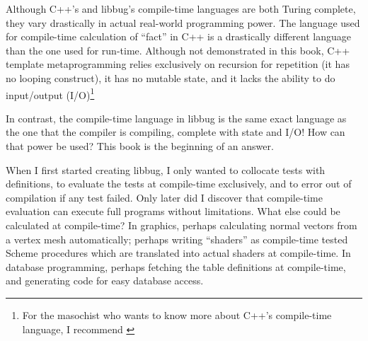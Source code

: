  Although C++'s and libbug's compile-time languages are both Turing complete,
 they vary drastically in actual real-world programming power.  The language used
 for compile-time calculation of ``fact'' in C++ is a drastically different language than
 the one used for run-time.  Although not demonstrated in this book,
 C++ template metaprogramming relies exclusively on recursion for repetition (it has no
 looping construct), it has no mutable state, and it lacks the ability to do input/output
 (I/O)\footnote{For the masochist who wants to know more about C++'s compile-time language,
 I recommend \cite{ctm} }

 In contrast, the compile-time
 language in libbug is the same exact language as the one that the compiler
 is compiling, complete with state and I/O!  How can that power be used?
 This book is the beginning of an answer.


 When I first started creating libbug, I only wanted to collocate
 tests with definitions, to evaluate the tests at compile-time exclusively, and to error out
 of compilation
 if any test failed.  Only later did I discover that compile-time evaluation
 can execute full programs without limitations.  What else could be
 calculated at compile-time?  In graphics, perhaps calculating normal vectors
 from a vertex mesh automatically; perhaps writing ``shaders'' as compile-time
 tested Scheme procedures which are translated into actual shaders at compile-time.
 In database programming, perhaps fetching the table definitions at compile-time,
 and generating code for easy database access.



